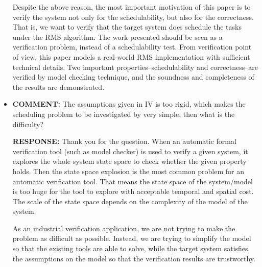\documentclass[10pt,journal]{IEEEtran}
\newcommand{\hide}[1]{\ignorespaces}
\newcommand{\ANSWER}{{\bf RESPONSE: }}
\newcommand{\COMMENT}{{\bf COMMENT: }}
\begin{document}
\begin{itemize}
Despite the above reason, the most important motivation of this paper
is to verify the system not only for the schedulability, but also for
the correctness. That is, we want to verify that the target system
does schedule the tasks under the RMS algorithm. The work presented
should be seen as a verification problem, instead of a schedulability
test. From verification point of view, this paper models a real-world
RMS implementation with sufficient technical details. Two important
properties--schedulability and correctness--are verified by model
checking technique, and the soundness and completeness of the results
are demonstrated.

\hide{
is a very simple scheduling and is the optimum at the same time among
the fixed-prority ones, making it widely applied and sufficiently
investigated. Besides the ideal setting, the schedulability of RMS was
also investigated under different kinds of implementations with
consideration about overhead, as we discuss in the related work
section (Section VI). Despite the reason that the existing results do
not fit our target system using RMS, the most important motivation to
develop the work presented is that, we aim at verifying the system not
only for the schedulability, but also for the correctness. That is, we
want to verify that the target system does schedule the tasks under
the RMS algorithm. The work presented should be seen as a verification
problem, instead of a schedulability test.
}

\item
\COMMENT The assumptions given in IV is too rigid, which makes the
scheduling problem to be investigated by very simple, then what is the
difficulty?

\ANSWER Thank you for the question. When an automatic formal
verification tool (such as model checker) is used to verify a given
system, it explores the whole system state space to check whether the
given property holds. Then the state space explosion is the most
common problem for an automatic verification tool. That means the
state space of the system/model is too huge for the tool to explore
with acceptable temporal and spatial cost. The scale of the state
space depends on the complexity of the model of the system.

As an industrial verification application, we are not trying to make
the problem as difficult as possible. Instead, we are trying to
simplify the model so that the existing tools are able to solve, while
the target system satisfies the assumptions on the model so that the
verification results are trustworthy.


\end{itemize}
\end{document}
